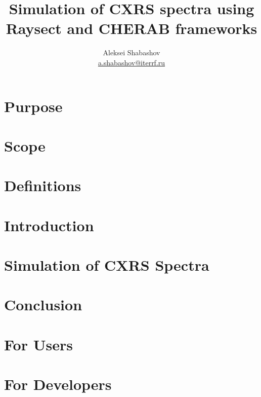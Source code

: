 \documentclass[a4paper,12pt,titlepage,english,final]{article}
\title{Simulation of CXRS spectra using Raysect and CHERAB frameworks}
\author{Aleksei Shabashov \\ \href{mailto:a.shabashov@iterrf.ru}{a.shabashov@iterrf.ru}}
\date{}
\begin{document}
\maketitle
\tableofcontents%

\section{Purpose}%
\label{sec:purpose}


\section{Scope}%
\label{sec:scope}


\section{Definitions}%
\label{sec:definitions}


\section{Introduction}%
\label{sec:introduction}


\section{Simulation of CXRS Spectra}%
\label{sec:simulation}


\section{Conclusion}%
\label{sec:conclusion}


\printbibliography%

\begin{appendices}
    \section{For Users}%
    \label{app:users}
    

    \section{For Developers}%
    \label{app:developers}
    
\end{appendices}
\end{document}
